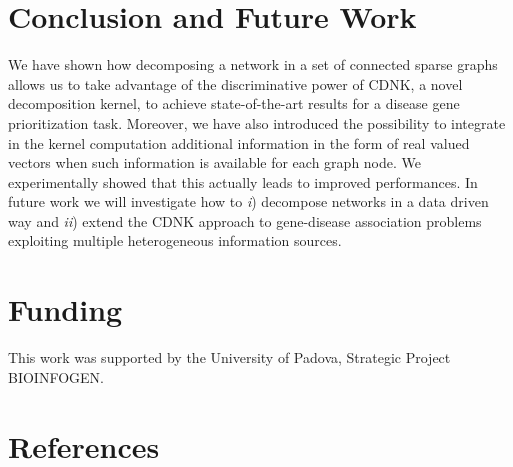 \documentclass[review]{elsarticle}
\begin{document}
\section{Conclusion and Future Work}
We have shown how decomposing a network in a set of connected sparse graphs allows us to take advantage of the discriminative power of CDNK, a novel decomposition kernel, to achieve state-of-the-art results for a disease gene prioritization task.
Moreover, we have also introduced the possibility to integrate in the kernel computation  additional information in the form of real valued vectors when such information is available for each graph node. We experimentally showed that this actually leads to improved performances. In future work we will investigate how to \textit{i}) decompose networks in a data driven way and \textit{ii}) extend the CDNK approach to gene-disease association problems exploiting multiple heterogeneous information sources.


\section*{Funding}
This work was supported by the University of Padova, Strategic Project BIOINFOGEN.
\section*{References}
\end{document}
